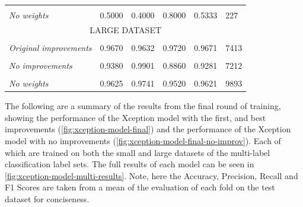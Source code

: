 \begin{longtable}[c]{l|l|l|l|l|l}
    \begin{tabular}[c]{@{}l@{}}Xception\\ \textit{No weights}\end{tabular} & 0.5000 & 0.4000 & 0.8000 & 0.5333 & 227 \\ \hline
    \multicolumn{6}{c}{LARGE DATASET} \\ \hline
    \begin{tabular}[c]{@{}l@{}}Xception\\ \textit{Original improvements}\end{tabular} & 0.9670 & 0.9632 & 0.9720 & 0.9671 & 7413 \\
    \begin{tabular}[c]{@{}l@{}}Xception\\ \textit{No improvements}\end{tabular} & 0.9380 & 0.9901 & 0.8860 & 0.9281 & 7212 \\
    \begin{tabular}[c]{@{}l@{}}Xception\\ \textit{No weights}\end{tabular} & 0.9625 & 0.9741 & 0.9520 & 0.9621 & 9893
    \label{fig:final-binary-results-short}
\end{longtable}

The following are a summary of the results from the final round of training, showing the performance of the Xception model with the first, and best improvements (\autoref{fig:xception-model-final}) and the performance of the Xception model with no improvements (\autoref{fig:xception-model-final-no-improv}). Each of which are trained on both the small and large datasets of the multi-label classification label sets. The full results of each model can be seen in \autoref{fig:xception-model-multi-results}. Note, here the Accuracy, Precision, Recall and F1 Scores are taken from a mean of the evaluation of each fold on the test dataset for conciseness.

